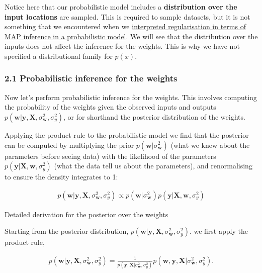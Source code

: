 \documentclass[11pt]{article}
\begin{document}
Notice here that our probabilistic model includes a \textbf{distribution
over the input locations} are sampled. This is required to sample
datasets, but it is not something that we encountered when we
\href{regression_regularisation.ipynb}{interpreted regularisation in
terms of MAP inference in a probabilistic model}. We will see that the
distribution over the inputs does not affect the inference for the
weights. This is why we have not specified a distributional family for
\(p(x)\).

    \subsubsection{2.1 Probabilistic inference for the
weights}\label{probabilistic-inference-for-the-weights}

Now let's perform probabilistic inference for the weights. This involves
computing the probability of the weights given the observed inputs and
outputs
\(p(\mathbf{w}|\mathbf{y}, \mathbf{X}, \sigma_{\mathbf{w}}^2, \sigma_{y}^2)\),
or for shorthand the posterior distribution of the weights.

Applying the product rule to the probabilistic model we find that the
posterior can be computed by multiplying the prior
\(p(\mathbf{w}| \sigma_{\mathbf{w}}^2)\) (what we knew about the
parameters before seeing data) with the likelihood of the parameters
\(p(\mathbf{y}|\mathbf{X}, \mathbf{w}, \sigma_y^2)\) (what the data tell
us about the parameters), and renormalising to ensure the density
integrates to 1:

\begin{align}
p(\mathbf{w}|\mathbf{y}, \mathbf{X}, \sigma_{\mathbf{w}}^2, \sigma_{y}^2)  \propto p(\mathbf{w}| \sigma_{\mathbf{w}}^2)  p(\mathbf{y}|\mathbf{X}, \mathbf{w}, \sigma_y^2)
\end{align}

 Detailed derivation for the posterior over the weights

Starting from the posterior distribution,
\(p(\mathbf{w}|\mathbf{y}, \mathbf{X}, \sigma_{\mathbf{w}}^2, \sigma_{y}^2)\).
we first apply the product rule,

\begin{align}
p(\mathbf{w}|\mathbf{y}, \mathbf{X}, \sigma_{\mathbf{w}}^2, \sigma_{y}^2) = 
 \frac{1}{
 p(\mathbf{y}, \mathbf{X}| \sigma_{\mathbf{w}}^2, \sigma_{y}^2)
 }
 p(\mathbf{w},\mathbf{y}, \mathbf{X}| \sigma_{\mathbf{w}}^2, \sigma_{y}^2).
\end{align}
\end{document}
